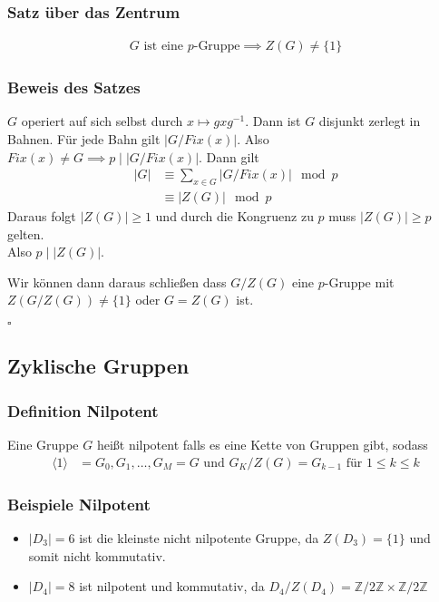 \documentclass[12pt, german]{article}
\newcommand{\bewiesen}{

\begin{flushright}
		$\square$  \\
\end{flushright}}
\begin{document}
\subsubsection{Satz über das Zentrum}
	\begin{align*}
		G \text{ ist eine $p$-Gruppe} \implies Z(G) \not = \{1\}
	\end{align*}

\subsubsection{Beweis des Satzes}
	$G$ operiert auf sich selbst durch $x \mapsto gxg^{-1}$. Dann ist $G$ disjunkt zerlegt in Bahnen. Für jede Bahn gilt $|G/Fix(x)|$. 
	Also $Fix(x) \not= G \implies p \mid |G/Fix(x)|$. Dann gilt 
	\begin{align*}
		|G| &\equiv \sum_{x \in G} |G/Fix(x)|  \mod p\\
		&\equiv |Z(G) |\mod p
	\end{align*}
	Daraus folgt $|Z(G)| \geq 1$ und durch die Kongruenz zu $p$ muss $|Z(G)|\geq p$ gelten. \\
	Also $p \mid |Z(G)|$. 
	\newline
	
	Wir können dann daraus schließen dass $G/Z(G)$ eine $p$-Gruppe mit $Z(G/Z(G)) \not = \{1\}$ oder $G=Z(G)$ ist.
	\bewiesen
	
\subsection{Zyklische Gruppen}
\subsubsection{Definition Nilpotent}
	Eine Gruppe $G$ heißt nilpotent falls es eine Kette von Gruppen gibt, sodass
	\begin{align*}
		\langle 1 \rangle &= G_0, G_1, \ldots, G_M = G  \text{ und } G_K/Z(G) = G_{k-1} \text{ für } 1 \leq k \leq k
	\end{align*}

\subsubsection{Beispiele Nilpotent}
	\begin{itemize}
		\item $|D_3| = 6$ ist die kleinste nicht nilpotente Gruppe, da $Z(D_3) = \{1\}$ und somit nicht kommutativ.
		\item $|D_4| = 8$ ist nilpotent und kommutativ, da $D_4/Z(D_4) = \mathbb Z/2 \mathbb Z \times \mathbb Z /2\mathbb Z$
	\end{itemize}
\end{document}
